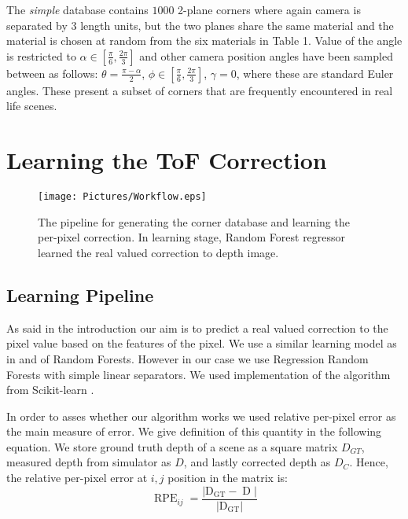 \documentclass[11pt,twocolumn]{article}
\begin{document}
The \textit{simple} database contains $1000$ 2-plane corners where again camera is separated by 3 length units, but the two planes share the same material and the material is chosen at random from the six materials in Table 1. Value of the angle is restricted to $\alpha \in [\frac{\pi}{6},\frac{2\pi}{3}]$ and other camera position angles have been sampled between as follows: $\theta = \frac{\pi-\alpha}{2}$, $\phi \in [\frac{\pi}{6},\frac{2\pi}{3}] $, $\gamma=0$, where these are standard Euler angles. These present a subset of corners that are frequently encountered in real life scenes.

\section{Learning the ToF Correction}

\begin{figure}
    \centering
    \texttt{[image: Pictures/Workflow.eps]}
    \caption{The pipeline for generating the corner database and learning the per-pixel correction. In learning stage, Random Forest regressor learned the real valued correction to depth image.}
    \label{fig:b}
\end{figure}


\subsection{Learning Pipeline}
As said in the introduction our aim is to predict a real valued correction to the pixel value based on the features of the pixel. We use a similar learning model as in \cite{Song2014} and \cite{Reynolds2011} of Random Forests. However in our case we use Regression Random Forests \cite{Criminisi2012} with simple linear separators. We used implementation of the algorithm from Scikit-learn \cite{scikit-learn}.

In order to asses whether our algorithm works we used relative per-pixel error as the main measure of error. We give definition of this quantity in the following equation. We store ground truth depth of a scene as a square matrix $D_{GT}$, measured depth from simulator as $D$, and lastly corrected depth as $D_C$. Hence, the relative per-pixel error at $i,j$ position in the matrix is:
\begin{equation}\label{eq:err}
\operatorname{RPE}_{ij}=\frac{|\operatorname{D_{GT}}-\operatorname{D}|}{|\operatorname{D_{GT}}|} \tag{Relative Per-Pixel Error}
\end{equation}
\end{document}
